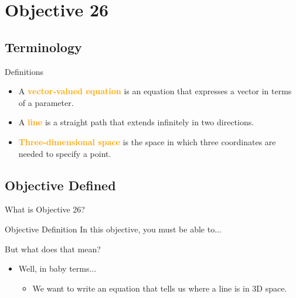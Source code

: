 \section{Objective 26}
\subsection{}
\frame{\sectionpage}
\subsection{Terminology}
\frame{\subsectionpage}
\begin{frame}{Definitions}
    \begin{itemize}
        \item<1->{A \textcolor{orange}{\textbf{vector-valued equation}} is an equation that expresses a vector in terms of a parameter.}
        \item<2->{A \textcolor{orange}{\textbf{line}} is a straight path that extends infinitely in two directions.}
        \item<3->{\textcolor{orange}{\textbf{Three-dimensional space}} is the space in which three coordinates are needed to specify a point.}
    \end{itemize}
\end{frame}
\subsection{Objective Defined}
\frame{\subsectionpage}
\begin{frame}{What is Objective 26?}
    \begin{block}{Objective Definition}
        In this objective, you must be able to... \\
        \color{orange}{``Write the vector-valued equation of a line in three dimensions.``}
    \end{block}
\end{frame}
\begin{frame}{But what does that mean?}
    \begin{itemize}
        \item<1-2>{Well, in baby terms...}
        \begin{itemize}
            \item<2>{We want to write an equation that tells us where a line is in 3D space.}
        \end{itemize}
    \end{itemize}
\end{frame}
